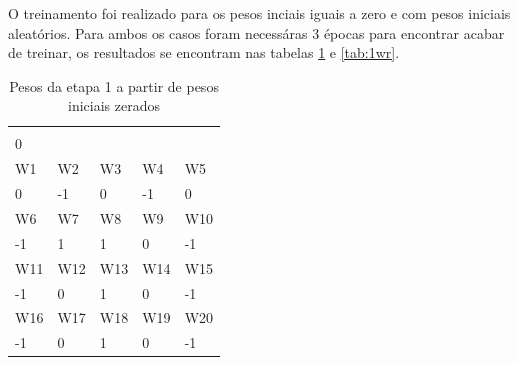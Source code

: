 \documentclass[11pt]{article}
\begin{document}
O treinamento foi realizado para os pesos inciais iguais a zero e com pesos iniciais
aleatórios. Para ambos os casos foram necessáras 3 épocas para encontrar acabar
de treinar, os resultados se encontram nas tabelas \ref{tab:1w0} e \ref{tab:1wr}.

\begin{table}[h]
  \centering
  \caption{Pesos da etapa 1 a partir de pesos iniciais zerados}
  \label{tab:1w0}
  \begin{tabular}{lllll}
  \cellcolor[HTML]{000000}{\color[HTML]{FFFFFF} W0} &                            &                            &                            &                            \\
  0                                                 &                            &                            &                            &                            \\
  \rowcolor[HTML]{000000}
  {\color[HTML]{FFFFFF} W1}                         & {\color[HTML]{FFFFFF} W2}  & {\color[HTML]{FFFFFF} W3}  & {\color[HTML]{FFFFFF} W4}  & {\color[HTML]{FFFFFF} W5}  \\
  0                                                 & -1                         & 0                          & -1                         & 0                          \\
  \rowcolor[HTML]{000000}
  {\color[HTML]{FFFFFF} W6}                         & {\color[HTML]{FFFFFF} W7}  & {\color[HTML]{FFFFFF} W8}  & {\color[HTML]{FFFFFF} W9}  & {\color[HTML]{FFFFFF} W10} \\
  -1                                                & 1                          & 1                          & 0                          & -1                         \\
  \rowcolor[HTML]{000000}
  {\color[HTML]{FFFFFF} W11}                        & {\color[HTML]{FFFFFF} W12} & {\color[HTML]{FFFFFF} W13} & {\color[HTML]{FFFFFF} W14} & {\color[HTML]{FFFFFF} W15} \\
  -1                                                & 0                          & 1                          & 0                          & -1                         \\
  \rowcolor[HTML]{000000}
  {\color[HTML]{FFFFFF} W16}                        & {\color[HTML]{FFFFFF} W17} & {\color[HTML]{FFFFFF} W18} & {\color[HTML]{FFFFFF} W19} & {\color[HTML]{FFFFFF} W20} \\
  -1                                                & 0                          & 1                          & 0                          & -1                         \\

\end{tabular}
\end{table}
\end{document}
